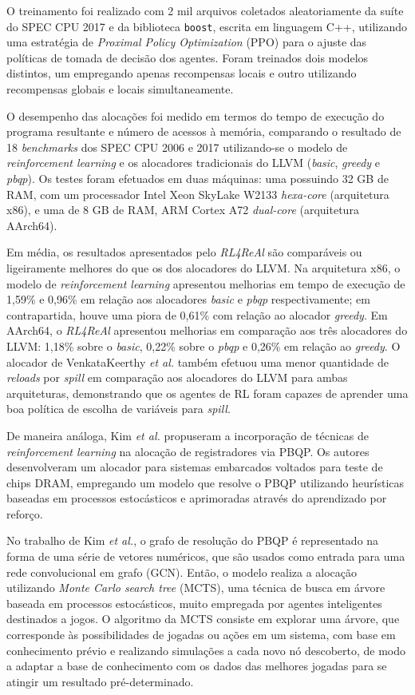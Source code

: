 \documentclass[
	12pt,				%
	openright,			%
	oneside,			%
	a4paper,			%
	tccpreliminar,			%
	]{ABNT-DC-UEL}
\begin{document}
O treinamento foi realizado com 2 mil arquivos coletados aleatoriamente da suíte do SPEC CPU 2017 e da biblioteca \texttt{boost}, escrita em linguagem C++, utilizando uma estratégia de \textit{Proximal Policy Optimization} (PPO) para o ajuste das políticas de tomada de decisão dos agentes. Foram treinados dois modelos distintos, um empregando apenas recompensas locais e outro utilizando recompensas globais e locais simultaneamente.

O desempenho das alocações foi medido em termos do tempo de execução do programa resultante e número de acessos à memória, comparando o resultado de 18 \textit{benchmarks} dos SPEC CPU 2006 e 2017 utilizando-se o modelo de \textit{reinforcement learning} e os alocadores tradicionais do LLVM (\textit{basic}, \textit{greedy} e \textit{pbqp}). Os testes foram efetuados em duas máquinas: uma possuindo 32 GB de RAM, com um processador Intel Xeon SkyLake W2133 \textit{hexa-core} (arquitetura x86), e uma de 8 GB de RAM, ARM Cortex A72 \textit{dual-core} (arquitetura AArch64).

Em média, os resultados apresentados pelo \textit{RL4ReAl} são comparáveis ou ligeiramente melhores do que os dos alocadores do LLVM. Na arquitetura x86, o modelo de \textit{reinforcement learning} apresentou melhorias em tempo de execução de 1,59\% e 0,96\% em relação aos alocadores \textit{basic} e \textit{pbqp} respectivamente; em contrapartida, houve uma piora de 0,61\% com relação ao alocador \textit{greedy}. Em AArch64, o \textit{RL4ReAl} apresentou melhorias em comparação aos três alocadores do LLVM: 1,18\% sobre o \textit{basic}, 0,22\% sobre o \textit{pbqp} e 0,26\% em relação ao \textit{greedy}. O alocador de VenkataKeerthy \textit{et al.} também efetuou uma menor quantidade de \textit{reloads} por \textit{spill} em comparação aos alocadores do LLVM para ambas arquiteturas, demonstrando que os agentes de RL foram capazes de aprender uma boa política de escolha de variáveis para \textit{spill}.

De maneira análoga, Kim \textit{et al.} \cite{kim:22} propuseram a incorporação de técnicas de \textit{reinforcement learning} na alocação de registradores via PBQP. Os autores desenvolveram um alocador para sistemas embarcados voltados para teste de chips DRAM, empregando um modelo que resolve o PBQP utilizando heurísticas baseadas em processos estocásticos e aprimoradas através do aprendizado por reforço.

No trabalho de Kim \textit{et al.}, o grafo de resolução do PBQP é representado na forma de uma série de vetores numéricos, que são usados como entrada para uma rede convolucional em grafo (GCN). Então, o modelo realiza a alocação utilizando \textit{Monte Carlo search tree} (MCTS), uma técnica de busca em árvore baseada em processos estocásticos, muito empregada por agentes inteligentes destinados a jogos. O algoritmo da MCTS consiste em explorar uma árvore, que corresponde às possibilidades de jogadas ou ações em um sistema, com base em conhecimento prévio e realizando simulações a cada novo nó descoberto, de modo a adaptar a base de conhecimento com os dados das melhores jogadas para se atingir um resultado pré-determinado.
\end{document}
